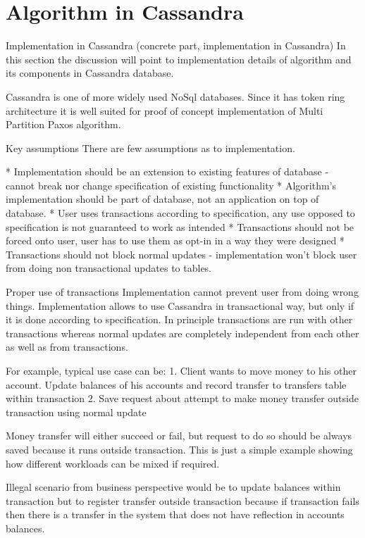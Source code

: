 \section{Algorithm in Cassandra}\label{sec:algo:c}
Implementation in Cassandra (concrete part, implementation in Cassandra)
In this section the discussion will point to implementation details of algorithm and its components in Cassandra database. 


Cassandra is one of more widely used NoSql databases. Since it has token ring architecture it is well suited for proof of concept implementation of Multi Partition Paxos algorithm.


Key assumptions
There are few assumptions as to implementation.


* Implementation should be an extension to existing features of database - cannot break nor change specification of existing functionality
* Algorithm’s implementation should be part of database, not an application on top of database.
* User uses transactions according to specification, any use opposed to specification is not guaranteed to work as intended
* Transactions should not be forced onto user, user has to use them as opt-in in a way they were designed
* Transactions should not block normal updates - implementation won’t block user from doing non transactional updates to tables.


Proper use of transactions
Implementation cannot prevent user from doing wrong things. Implementation allows to use Cassandra in transactional way, but only if it is done according to specification. In principle transactions are run with other transactions whereas normal updates are completely independent from each other as well as from transactions. 


For example, typical use case can be:
1. Client wants to move money to his other account.  Update balances of his accounts and record transfer to transfers table within transaction
2. Save request about attempt to make money transfer outside transaction using normal update


Money transfer will either succeed or fail, but request to do so should be always saved because it runs outside transaction. This is just a simple example showing how different workloads can be mixed if required. 


Illegal scenario from business perspective would be to update balances within transaction but to register transfer outside transaction because if transaction fails then there is a transfer in the system that does not have reflection in accounts balances. 



